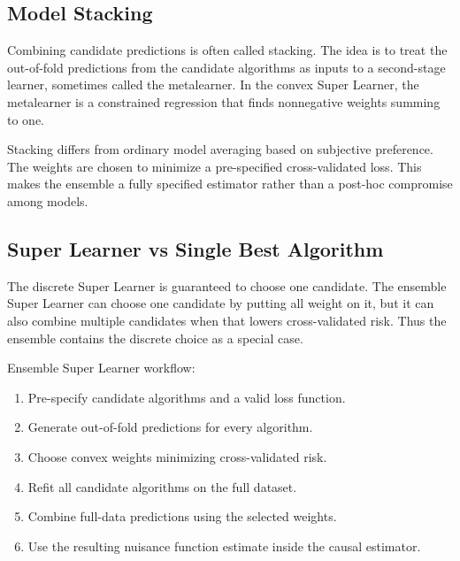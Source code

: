 \subsection{Model Stacking}

Combining candidate predictions is often called stacking. The idea is to treat the
out-of-fold predictions from the candidate algorithms as inputs to a second-stage
learner, sometimes called the metalearner. In the convex Super Learner, the
metalearner is a constrained regression that finds nonnegative weights summing to
one.

Stacking differs from ordinary model averaging based on subjective preference. The
weights are chosen to minimize a pre-specified cross-validated loss. This makes the
ensemble a fully specified estimator rather than a post-hoc compromise among models.

\subsection{Super Learner vs Single Best Algorithm}

The discrete Super Learner is guaranteed to choose one candidate. The ensemble Super
Learner can choose one candidate by putting all weight on it, but it can also combine
multiple candidates when that lowers cross-validated risk. Thus the ensemble contains
the discrete choice as a special case.

\begin{estimationbox}
Ensemble Super Learner workflow:
\begin{enumerate}
\item Pre-specify candidate algorithms and a valid loss function.
\item Generate out-of-fold predictions for every algorithm.
\item Choose convex weights minimizing cross-validated risk.
\item Refit all candidate algorithms on the full dataset.
\item Combine full-data predictions using the selected weights.
\item Use the resulting nuisance function estimate inside the causal estimator.
\end{enumerate}
\end{estimationbox}
